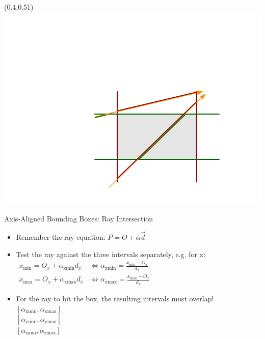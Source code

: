 \documentclass[utf8,stillsansserifmath,fleqn,t]{beamer}
\begin{document}
\begin{frame}[fragile]
\frametitle{\insertsection}
\begin{textblock}{0.4}(0.4,0.51) \includegraphics[width=\textwidth]{./fig/aabb-ray-0.pdf} \end{textblock}
Axis-Aligned Bounding Boxes: Ray Intersection
\begin{itemize}
\item Remember the ray equation: $P = O + \alpha\vec{d}$
\item Test the ray against the three intervals separately, e.g. for x:\\
$\begin{aligned}
x_{\min} = O_x + \alpha_\text{xmin} d_x &\iff \alpha_\text{xmin} = \frac{x_{\min} - O_x}{d_x}\\
x_{\max} = O_x + \alpha_\text{xmax} d_x &\iff \alpha_\text{xmax} = \frac{x_{\max} - O_x}{d_x}
\end{aligned}$
\item For the ray to hit the box, the resulting intervals must overlap!\\
    $[\alpha_\text{xmin}, \alpha_\text{xmax}]$\\
    $[\alpha_\text{ymin}, \alpha_\text{ymax}]$\\
    $[\alpha_\text{zmin}, \alpha_\text{zmax}]$\\
\end{itemize}
\end{frame}
\end{document}
